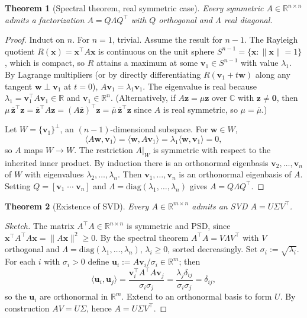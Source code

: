 \documentclass[11pt]{article}
\newtheorem{theorem}{Theorem}[section]
\theoremstyle{remark}
\begin{document}
\begin{theorem}[Spectral theorem, real symmetric case]
Every symmetric $A\in\mathbb{R}^{n\times n}$ admits a factorization $A=Q\Lambda Q^\top$ with $Q$ orthogonal and $\Lambda$ real diagonal.
\end{theorem}
\begin{proof}
Induct on $n$. For $n=1$, trivial. Assume the result for $n-1$. The Rayleigh quotient $R(\mathbf{x})=\mathbf{x}^\top A\mathbf{x}$ is continuous on the unit sphere $S^{n-1}=\{\mathbf{x}:\|\mathbf{x}\|=1\}$, which is compact, so $R$ attains a maximum at some $\mathbf{v}_1\in S^{n-1}$ with value $\lambda_1$. By Lagrange multipliers (or by directly differentiating $R(\mathbf{v}_1+t\mathbf{w})$ along any tangent $\mathbf{w}\perp\mathbf{v}_1$ at $t=0$), $A\mathbf{v}_1=\lambda_1\mathbf{v}_1$. The eigenvalue is real because $\lambda_1=\mathbf{v}_1^\top A\mathbf{v}_1\in\mathbb{R}$ and $\mathbf{v}_1\in\mathbb{R}^n$. (Alternatively, if $A\mathbf{z}=\mu\mathbf{z}$ over $\mathbb{C}$ with $\mathbf{z}\ne\mathbf{0}$, then $\mu\,\overline{\mathbf{z}}^\top\mathbf{z}=\overline{\mathbf{z}}^\top A\mathbf{z}=(A\overline{\mathbf{z}})^\top\mathbf{z}=\overline{\mu}\,\overline{\mathbf{z}}^\top\mathbf{z}$ since $A$ is real symmetric, so $\mu=\overline{\mu}$.)

Let $W=\{\mathbf{v}_1\}^{\perp}$, an $(n-1)$-dimensional subspace. For $\mathbf{w}\in W$,
\[
\langle A\mathbf{w},\mathbf{v}_1\rangle=\langle\mathbf{w},A\mathbf{v}_1\rangle=\lambda_1\langle\mathbf{w},\mathbf{v}_1\rangle=0,
\]
so $A$ maps $W\to W$. The restriction $A|_W$ is symmetric with respect to the inherited inner product. By induction there is an orthonormal eigenbasis $\mathbf{v}_2,\dots,\mathbf{v}_n$ of $W$ with eigenvalues $\lambda_2,\dots,\lambda_n$. Then $\mathbf{v}_1,\dots,\mathbf{v}_n$ is an orthonormal eigenbasis of $A$. Setting $Q=[\mathbf{v}_1\;\cdots\;\mathbf{v}_n]$ and $\Lambda=\mathrm{diag}(\lambda_1,\dots,\lambda_n)$ gives $A=Q\Lambda Q^\top$.
\end{proof}

\begin{theorem}[Existence of SVD]
Every $A\in\mathbb{R}^{m\times n}$ admits an SVD $A=U\Sigma V^\top$.
\end{theorem}
\begin{proof}[Sketch]
The matrix $A^\top A\in\mathbb{R}^{n\times n}$ is symmetric and PSD, since $\mathbf{x}^\top A^\top A\mathbf{x}=\|A\mathbf{x}\|^2\ge 0$. By the spectral theorem $A^\top A=V\Lambda V^\top$ with $V$ orthogonal and $\Lambda=\mathrm{diag}(\lambda_1,\dots,\lambda_n)$, $\lambda_i\ge 0$, sorted decreasingly. Set $\sigma_i:=\sqrt{\lambda_i}$. For each $i$ with $\sigma_i>0$ define $\mathbf{u}_i:=A\mathbf{v}_i/\sigma_i\in\mathbb{R}^m$; then
\[
\langle\mathbf{u}_i,\mathbf{u}_j\rangle=\frac{\mathbf{v}_i^\top A^\top A\mathbf{v}_j}{\sigma_i\sigma_j}=\frac{\lambda_j\delta_{ij}}{\sigma_i\sigma_j}=\delta_{ij},
\]
so the $\mathbf{u}_i$ are orthonormal in $\mathbb{R}^m$. Extend to an orthonormal basis to form $U$. By construction $A V=U\Sigma$, hence $A=U\Sigma V^\top$.
\end{proof}
\end{document}

